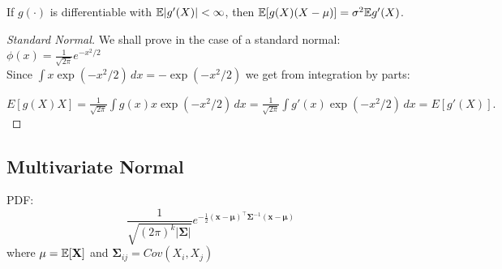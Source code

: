 \documentclass[DIV=14,titlepage=false]{scrreprt}
\begin{document}
\begin{lemma}
  If $ g(\cdot) $ is differentiable with $ \mathbb{E} | g'(X)| < \infty $, then $ \mathbb{E} [g(X)(X - \mu)] = \sigma^2 \mathbb{E} g'(X) $.
\end{lemma}

\begin{proof}[Standard Normal]
  We shall prove in the case of a standard normal: $\phi(x) = \frac{1}{\sqrt{2\pi}} e^{-x^2/2}$
\\
  Since $\int x \exp(-x^2/2) \, dx = - \exp(-x^2/2)$ we get from integration by parts:
  
  $E[g(X)X] = \frac{1}{\sqrt{2\pi}} \int g(x) x \exp(-x^2/2) \, dx = \frac{1}{\sqrt{2\pi}} \int g'(x) \exp(-x^2/2) \, dx = E[g'(X)].$
\end{proof}

\subsection*{Multivariate Normal}
PDF: \[ \displaystyle \frac{1}{\sqrt{(2\pi)^k|\boldsymbol{\Sigma}|}} e^{-\frac{1}{2}(\mathbf{x}-\boldsymbol{\mu})^\top\boldsymbol{\Sigma}^{-1}(\mathbf{x}-\boldsymbol{\mu})} \]
where $ \mathbf{\mu} = \mathbb{E} [\mathbf{X}] $ and $ \mathbf{\Sigma}_{ij} = Cov (X_i, X_j) $
\vspace{10pt}
\end{document}
